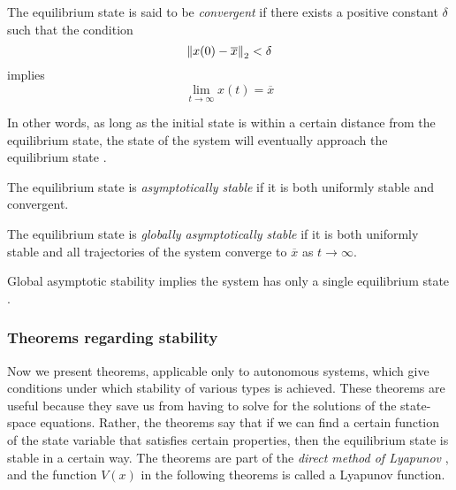\begin{definition}
  The equilibrium state is said to be \emph{convergent} if there exists a positive constant $\delta$ such that the condition
  \begin{equation*}
    \left\lVert x(0) - \overline{x} \right\rVert_2 < \delta
  \end{equation*}
  implies 
  \begin{equation*}
    \lim_{t \to \infty} x(t) = \overline{x}
  \end{equation*}
  \cite[p. 681]{Haykin:2009:NNC:1213811}
\end{definition}

In other words, as long as the initial state is within a certain distance from the equilibrium state, the state of the system will eventually approach the equilibrium state \cite[p. 681]{Haykin:2009:NNC:1213811}.

\begin{definition}
  The equilibrium state is \emph{asymptotically stable} if it is both uniformly stable and convergent.
  \cite{wilson2010}
\end{definition}

\begin{definition}
  The equilibrium state is \emph{globally asymptotically stable} if it is both uniformly stable and all trajectories of the system converge to $\overline{x}$ as $t \to \infty$.
  \cite{wilson2010}
\end{definition}

Global asymptotic stability implies the system has only a single equilibrium state \cite[p. 681]{Haykin:2009:NNC:1213811}.

\subsubsection{Theorems regarding stability}

Now we present theorems, applicable only to autonomous systems, which give conditions under which stability of various types is achieved. These theorems are useful because they save us from having to solve for the solutions of the state-space equations. Rather, the theorems say that if we can find a certain function of the state variable that satisfies certain properties, then the equilibrium state is stable in a certain way. The theorems are part of the \emph{direct method of Lyapunov} \cite[p. 682]{Haykin:2009:NNC:1213811}, and the function $V(x)$ in the following theorems is called a Lyapunov function.

